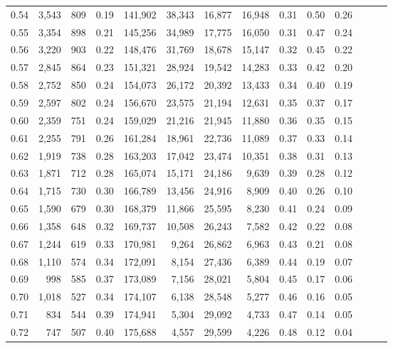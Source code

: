 \begin{tabular}{rrrrrrrrrrrrrr}
0.54 &  3,543 &  809 &  0.19 &  141,902 &   38,343 &  16,877 &  16,948 &  0.31 &  0.50 &      0.26 \\
0.55 &  3,354 &  898 &  0.21 &  145,256 &   34,989 &  17,775 &  16,050 &  0.31 &  0.47 &      0.24 \\
0.56 &  3,220 &  903 &  0.22 &  148,476 &   31,769 &  18,678 &  15,147 &  0.32 &  0.45 &      0.22 \\
0.57 &  2,845 &  864 &  0.23 &  151,321 &   28,924 &  19,542 &  14,283 &  0.33 &  0.42 &      0.20 \\
0.58 &  2,752 &  850 &  0.24 &  154,073 &   26,172 &  20,392 &  13,433 &  0.34 &  0.40 &      0.19 \\
0.59 &  2,597 &  802 &  0.24 &  156,670 &   23,575 &  21,194 &  12,631 &  0.35 &  0.37 &      0.17 \\
0.60 &  2,359 &  751 &  0.24 &  159,029 &   21,216 &  21,945 &  11,880 &  0.36 &  0.35 &      0.15 \\
0.61 &  2,255 &  791 &  0.26 &  161,284 &   18,961 &  22,736 &  11,089 &  0.37 &  0.33 &      0.14 \\
0.62 &  1,919 &  738 &  0.28 &  163,203 &   17,042 &  23,474 &  10,351 &  0.38 &  0.31 &      0.13 \\
0.63 &  1,871 &  712 &  0.28 &  165,074 &   15,171 &  24,186 &   9,639 &  0.39 &  0.28 &      0.12 \\
0.64 &  1,715 &  730 &  0.30 &  166,789 &   13,456 &  24,916 &   8,909 &  0.40 &  0.26 &      0.10 \\
0.65 &  1,590 &  679 &  0.30 &  168,379 &   11,866 &  25,595 &   8,230 &  0.41 &  0.24 &      0.09 \\
0.66 &  1,358 &  648 &  0.32 &  169,737 &   10,508 &  26,243 &   7,582 &  0.42 &  0.22 &      0.08 \\
0.67 &  1,244 &  619 &  0.33 &  170,981 &    9,264 &  26,862 &   6,963 &  0.43 &  0.21 &      0.08 \\
0.68 &  1,110 &  574 &  0.34 &  172,091 &    8,154 &  27,436 &   6,389 &  0.44 &  0.19 &      0.07 \\
0.69 &    998 &  585 &  0.37 &  173,089 &    7,156 &  28,021 &   5,804 &  0.45 &  0.17 &      0.06 \\
0.70 &  1,018 &  527 &  0.34 &  174,107 &    6,138 &  28,548 &   5,277 &  0.46 &  0.16 &      0.05 \\
0.71 &    834 &  544 &  0.39 &  174,941 &    5,304 &  29,092 &   4,733 &  0.47 &  0.14 &      0.05 \\
0.72 &    747 &  507 &  0.40 &  175,688 &    4,557 &  29,599 &   4,226 &  0.48 &  0.12 &      0.04 \\

\end{tabular}
